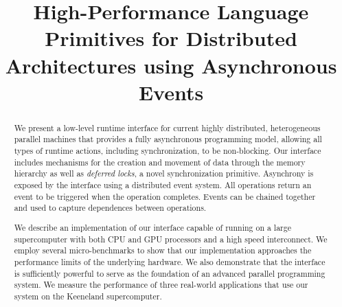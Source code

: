 \documentclass{sig-alternate}
\begin{document}
\title{High-Performance Language Primitives for Distributed Architectures using Asynchronous Events}
\maketitle

\begin{abstract}
We present a low-level runtime interface for current highly distributed, heterogeneous
parallel machines that provides a fully asynchronous 
programming model, allowing all types of runtime actions, including synchronization,
to be non-blocking.  Our interface includes mechanisms for the creation and movement
of data through the memory hierarchy as well as {\em deferred locks}, a novel synchronization primitive.
Asynchrony is exposed by the interface using a distributed event system.  All
operations return an event to be triggered when the operation completes.  Events
can be chained together and used to capture dependences between operations.

We describe an implementation of our interface capable of running on
a large supercomputer with both CPU and GPU processors and a high speed interconnect.
We employ several micro-benchmarks to show that our implementation approaches
the performance limits of the underlying hardware.
We also demonstrate that the interface is sufficiently powerful to serve as the foundation 
of an advanced parallel programming system.  We measure the performance of three real-world applications
that use our system on the Keeneland supercomputer.
\end{abstract}

%









{
\small


}
\end{document}

